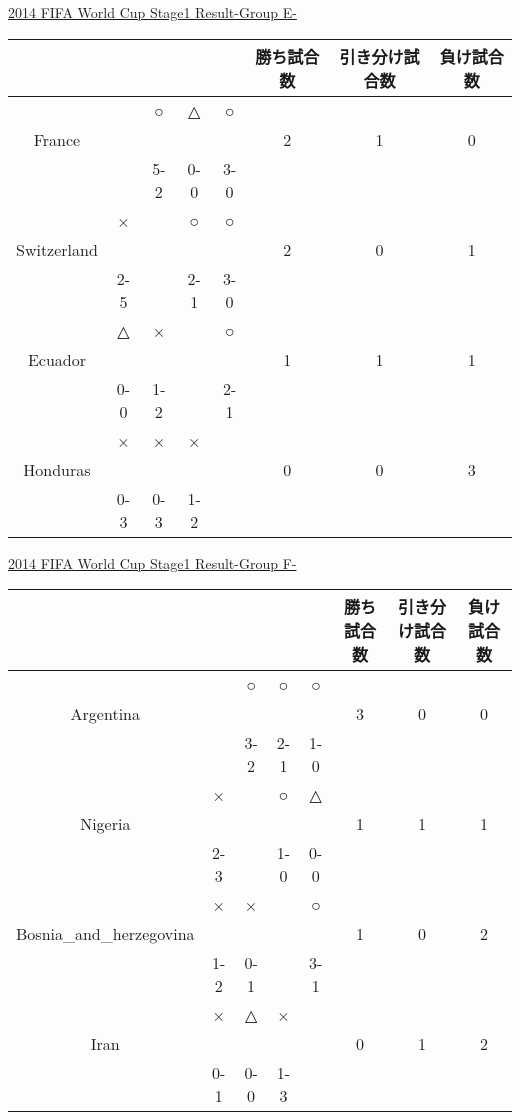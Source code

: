 \documentclass[a4j] {jarticle}
\begin{document}
		\newpage
		\begin{table}[htb]
		\begin{center}
		\underline{2014 FIFA World Cup Stage1 Result-Group E-}
		\begin{tabular}{|c|c|c|c|c|c|c|c|}
		\hline
		\multicolumn{1}{|c|}{} &
		\multicolumn{1}{c|}{} &
		\multicolumn{1}{c|}{} &
		\multicolumn{1}{c|}{} &
		\multicolumn{1}{c|}{} &
		\multicolumn{1}{c|}{勝ち試合数} &
		\multicolumn{1}{c|}{引き分け試合数} &
		\multicolumn{1}{c|}{負け試合数} \\
		\hline
 &  & ○ & △ & ○ & & & \\ 
France & & & & & 2 & 1 & 0 \\ 
 & & 5-2 & 0-0 & 3-0 &  & & \\ 
 \hline
 & × &  & ○ & ○ & & & \\ 
Switzerland & & & & & 2 & 0 & 1 \\ 
 &2-5 &  & 2-1 & 3-0 &  & & \\ 
 \hline
 & △ & × &  & ○ & & & \\ 
Ecuador & & & & & 1 & 1 & 1 \\ 
 &0-0 & 1-2 &  & 2-1 &  & & \\ 
 \hline
 & × & × & × &  & & & \\ 
Honduras & & & & & 0 & 0 & 3 \\ 
 &0-3 & 0-3 & 1-2 &  &  & & \\ 
 \hline
		\end{tabular}
		\end{center}
		\end{table}
		\newpage
		\begin{table}[htb]
		\begin{center}
		\underline{2014 FIFA World Cup Stage1 Result-Group F-}
		\begin{tabular}{|c|c|c|c|c|c|c|c|}
		\hline
		\multicolumn{1}{|c|}{} &
		\multicolumn{1}{c|}{} &
		\multicolumn{1}{c|}{} &
		\multicolumn{1}{c|}{} &
		\multicolumn{1}{c|}{} &
		\multicolumn{1}{c|}{勝ち試合数} &
		\multicolumn{1}{c|}{引き分け試合数} &
		\multicolumn{1}{c|}{負け試合数} \\
		\hline
 &  & ○ & ○ & ○ & & & \\ 
Argentina & & & & & 3 & 0 & 0 \\ 
 & & 3-2 & 2-1 & 1-0 &  & & \\ 
 \hline
 & × &  & ○ & △ & & & \\ 
Nigeria & & & & & 1 & 1 & 1 \\ 
 &2-3 &  & 1-0 & 0-0 &  & & \\ 
 \hline
 & × & × &  & ○ & & & \\ 
Bosnia\_and\_herzegovina & & & & & 1 & 0 & 2 \\ 
 &1-2 & 0-1 &  & 3-1 &  & & \\ 
 \hline
 & × & △ & × &  & & & \\ 
Iran & & & & & 0 & 1 & 2 \\ 
 &0-1 & 0-0 & 1-3 &  &  & & \\ 
 \hline
		\end{tabular}
		\end{center}
		\end{table}
\end{document}
